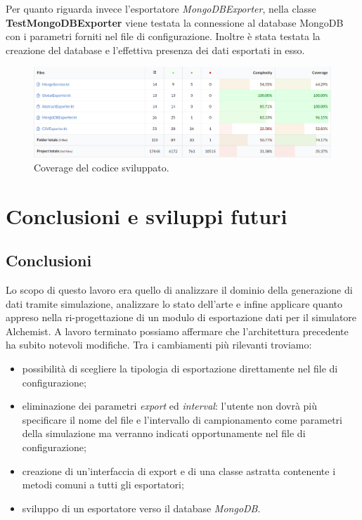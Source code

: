 \documentclass[12pt,a4paper,openright,oneside]{book}
\begin{document}
    Per quanto riguarda invece l'esportatore \textit{MongoDBExporter}, nella classe \textbf{TestMongoDBExporter} viene testata la connessione al database MongoDB con i parametri forniti nel file di configurazione. Inoltre è stata testata la creazione del database e l'effettiva presenza dei dati esportati in esso.
    \begin{figure}
	\centering
	\includegraphics[width=1\linewidth]{images/coverage.png}
	\caption{Coverage del codice sviluppato.}
	\label{fig:code-coverage}
    \end{figure}
    
\chapter{Conclusioni e sviluppi futuri }

\section{Conclusioni}
    Lo scopo di questo lavoro era quello di analizzare il dominio della generazione di dati tramite simulazione, analizzare lo stato dell'arte e infine applicare quanto appreso nella ri-progettazione di un modulo di esportazione dati per il simulatore Alchemist.
    A lavoro terminato possiamo affermare che l'architettura precedente ha subito notevoli modifiche. Tra i cambiamenti più rilevanti troviamo:
    \begin{itemize}
        \item possibilità di scegliere la tipologia di esportazione direttamente nel file di configurazione;
        \item eliminazione dei parametri \textit{export} ed \textit{interval}: l'utente non dovrà più specificare il nome del file e l'intervallo di campionamento come parametri della simulazione ma verranno indicati opportunamente nel file di configurazione;
        \item creazione di un'interfaccia di export e di una classe astratta contenente i metodi comuni a tutti gli esportatori;
        \item sviluppo di un esportatore verso il database \textit{MongoDB}.
    \end{itemize} 
    
\end{document}
